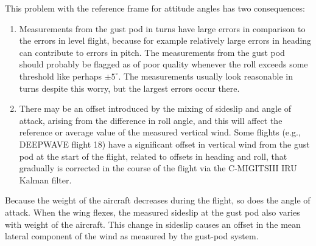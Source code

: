 \documentclass[12pt,twoside,english]{article}\usepackage[]{graphicx}\usepackage[]{color}
\let\OrgIndex\index
\renewcommand*{\index}[1]{\OrgIndex{#1}}
\begin{document}
This problem with the reference frame for attitude angles has two consequences:  
\begin{enumerate}
\item Measurements from the gust pod in turns have large errors in comparison to the errors in level flight, because for example relatively large errors in heading can contribute to errors in pitch. The measurements from the gust pod should probably be flagged as of poor quality whenever the roll exceeds some threshold like perhaps $\pm5^{\circ}$. The measurements usually look reasonable in turns despite this worry, but the largest errors occur there.  
\item There may be an offset introduced by the mixing of sideslip and angle of attack, arising from the difference in roll angle, and this will affect the reference or average value of the measured vertical wind. Some flights (e.g., DEEPWAVE flight 18) have a significant offset in vertical wind from the gust pod at the start of the flight, related to offsets in heading and roll, that gradually is corrected in the course of the flight via the C-MIGITSIII IRU Kalman filter.  
\end{enumerate}
Because the weight of the aircraft decreases during the flight, so does the angle of attack. When the wing flexes, the measured sideslip at the gust pod also varies with weight of the aircraft. This change in sideslip causes an offset in the mean lateral component of the wind as measured by the gust-pod system. 
\end{document}

